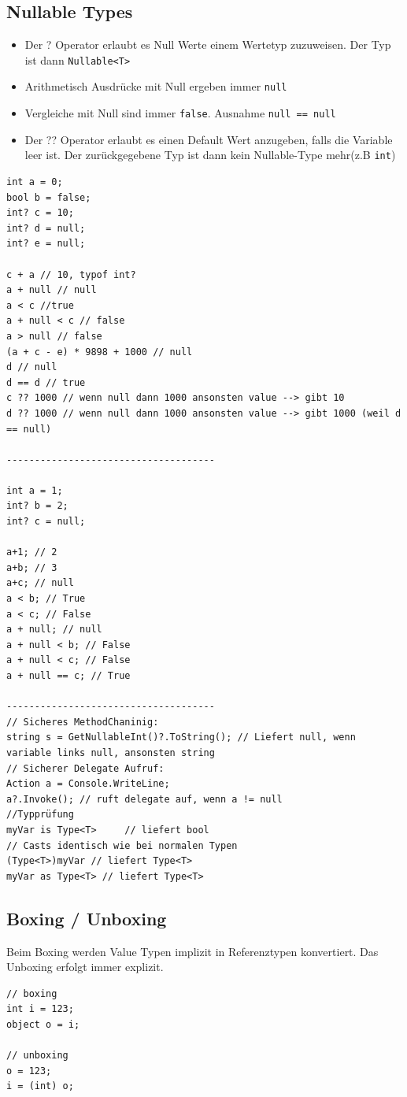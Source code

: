 \documentclass[
a4paper,
oneside,
10pt,
fleqn,
headsepline,
toc=listofnumbered, 
bibliography=totocnumbered]{scrartcl}
\begin{document}
\clearpage

\subsection{Nullable Types}
\begin{itemize}
	\item Der ? Operator erlaubt es Null Werte einem Wertetyp zuzuweisen. Der Typ ist dann \lstinline|Nullable<T>|
	\item Arithmetisch Ausdrücke mit Null ergeben immer \lstinline|null|
	\item Vergleiche mit Null sind immer \lstinline|false|. Ausnahme \lstinline|null == null|
	\item Der ?? Operator erlaubt es einen Default Wert anzugeben, falls die Variable leer ist. Der zurückgegebene Typ ist dann kein Nullable-Type mehr(z.B \lstinline|int|)
\end{itemize}
\begin{lstlisting}
int a = 0;
bool b = false;
int? c = 10;
int? d = null;
int? e = null;

c + a // 10, typof int?
a + null // null
a < c //true
a + null < c // false
a > null // false
(a + c - e) * 9898 + 1000 // null
d // null
d == d // true
c ?? 1000 // wenn null dann 1000 ansonsten value --> gibt 10 
d ?? 1000 // wenn null dann 1000 ansonsten value --> gibt 1000 (weil d == null)

-------------------------------------

int a = 1;
int? b = 2;
int? c = null;

a+1; // 2
a+b; // 3
a+c; // null
a < b; // True
a < c; // False
a + null; // null
a + null < b; // False
a + null < c; // False
a + null == c; // True

-------------------------------------
// Sicheres MethodChaninig:
string s = GetNullableInt()?.ToString(); // Liefert null, wenn variable links null, ansonsten string
// Sicherer Delegate Aufruf:
Action a = Console.WriteLine;
a?.Invoke(); // ruft delegate auf, wenn a != null
//Typprüfung
myVar is Type<T>     // liefert bool 
// Casts identisch wie bei normalen Typen
(Type<T>)myVar // liefert Type<T> 
myVar as Type<T> // liefert Type<T> 
\end{lstlisting}

\clearpage

\subsection{Boxing / Unboxing}
Beim Boxing werden Value Typen implizit in Referenztypen konvertiert. Das Unboxing erfolgt immer explizit.
\begin{lstlisting}
// boxing
int i = 123;
object o = i;

// unboxing
o = 123;
i = (int) o;
\end{lstlisting}
\end{document}
